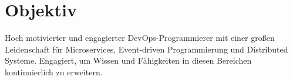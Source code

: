 \documentclass[../main.tex]{subfiles}
\begin{document}
  \section{Objektiv}
  \begin{category}
    \citembullet  
    Hoch motivierter und engagierter DevOps-Programmierer mit einer 
    großen Leidenschaft für Microservices, Event-driven Programmierung 
    und Distributed Systeme. Engagiert, um Wissen und Fähigkeiten in 
    diesen Bereichen kontinuierlich zu erweitern.
  \end{category}
\end{document}

